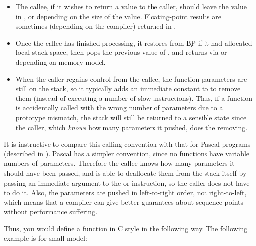 \begin{itemize}
    \item{The callee, if it wishes to return a value to the caller, should
        leave the value in ,  or  depending
        on the size of the value. Floating-point results are sometimes
        (depending on the compiler) returned in .}

    \item{Once the callee has finished processing, it restores  from
        \c{BP} if it had allocated local stack space, then pops the previous
        value of , and returns via  or  depending on
        memory model.}

    \item{When the caller regains control from the callee, the function
        parameters are still on the stack, so it typically adds an immediate
        constant to  to remove them (instead of executing a number of
        slow  instructions). Thus, if a function is accidentally
        called with the wrong number of parameters due to a prototype
        mismatch, the stack will still be returned to a sensible state since
        the caller, which \emph{knows} how many parameters it pushed, does the
        removing.}
\end{itemize}

It is instructive to compare this calling convention with that for
Pascal programs (described in ). Pascal has
a simpler convention, since no functions have variable numbers of parameters.
Therefore the callee knows how many parameters it should have been
passed, and is able to deallocate them from the stack itself by
passing an immediate argument to the  or 
instruction, so the caller does not have to do it. Also, the
parameters are pushed in left-to-right order, not right-to-left,
which means that a compiler can give better guarantees about
sequence points without performance suffering.

Thus, you would define a function in C style in the following way.
The following example is for small model:

